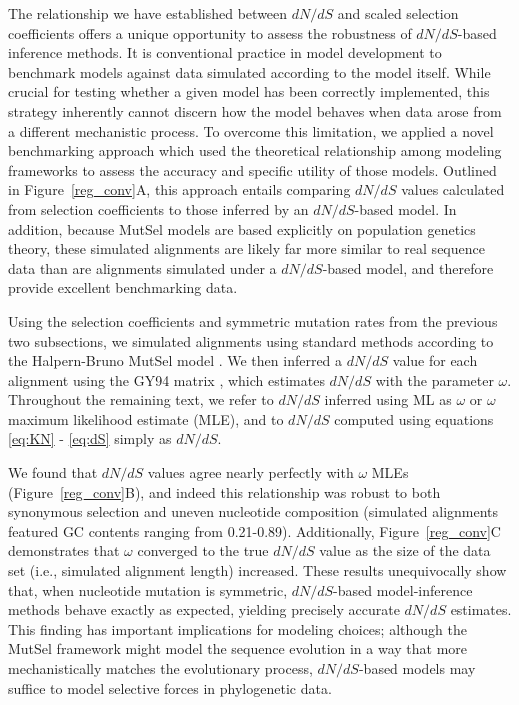 \documentclass[11pt]{article}
\begin{document}
The relationship we have established between $dN/dS$ and scaled selection coefficients offers a unique opportunity to assess the robustness of $dN/dS$-based inference methods. It is conventional practice in model development to benchmark models against data simulated according to the model itself. While crucial for testing whether a given model has been correctly implemented, this strategy inherently cannot discern how the model behaves when data arose from a different mechanistic process. To overcome this limitation, we applied a novel benchmarking approach which used the theoretical relationship among modeling frameworks to assess the accuracy and specific utility of those models. Outlined in Figure~\ref{reg_conv}A, this approach entails comparing $dN/dS$ values calculated from selection coefficients to those inferred by an $dN/dS$-based model. In addition, because MutSel models are based explicitly on population genetics theory, these simulated alignments are likely far more similar to real sequence data than are alignments simulated under a $dN/dS$-based model, and therefore provide excellent benchmarking data.

Using the selection coefficients and symmetric mutation rates from the previous two subsections, we simulated alignments using standard methods \citep{Yang2006} according to the Halpern-Bruno MutSel model \citep{HalpernBruno1998}. We then inferred a $dN/dS$ value for each alignment using the GY94 matrix \citep{GoldmanYang1994,NielsenYang1998}, which estimates $dN/dS$ with the parameter $\omega$. Throughout the remaining text, we refer to $dN/dS$ inferred using ML as $\omega$ or $\omega$ maximum likelihood estimate (MLE), and to $dN/dS$ computed using equations \eqref{eq:KN} - \eqref{eq:dS} simply as $dN/dS$. 

We found that $dN/dS$ values agree nearly perfectly with $\omega$ MLEs (Figure~\ref{reg_conv}B), and indeed this relationship was robust to both synonymous selection and uneven nucleotide composition (simulated alignments featured GC contents ranging from 0.21-0.89). Additionally, Figure~\ref{reg_conv}C demonstrates that $\omega$ converged to the true $dN/dS$ value as the size of the data set (i.e., simulated alignment length) increased. These results unequivocally show that, when nucleotide mutation is symmetric,  $dN/dS$-based model-inference methods behave exactly as expected, yielding precisely accurate $dN/dS$ estimates. This finding has important implications for modeling choices; although the MutSel framework might model the sequence evolution in a way that more mechanistically matches the evolutionary process, $dN/dS$-based models may suffice to model selective forces in phylogenetic data.
\end{document}
